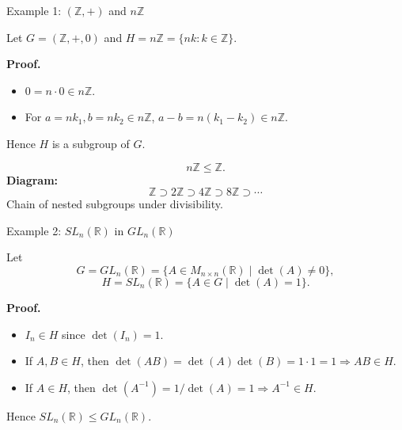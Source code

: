 \documentclass[11pt,aspectratio=43,ignorenonframetext,t]{beamer}
\begin{document}
\begin{frame}{Example 1: $(\mathbb{Z}, +)$ and $n\mathbb{Z}$}
\begin{block}{}
    Let \(G=(\mathbb{Z}, +, 0)\) and \(H = n\mathbb{Z} = \{nk : k\in \mathbb{Z}\}.\)

\textbf{Proof.}
\begin{itemize}
  \item \(0 = n\cdot 0 \in n\mathbb{Z}\).
  \item For \(a=nk_1, b=nk_2 \in n\mathbb{Z}\), \(a-b = n(k_1-k_2)\in n\mathbb{Z}\).
\end{itemize}
Hence \(H\) is a subgroup of \(G.\)

\[
n\mathbb{Z} \le \mathbb{Z}.
\]
\textbf{Diagram:}
\[
\mathbb{Z} \supset 2\mathbb{Z} \supset 4\mathbb{Z} \supset 8\mathbb{Z} \supset \cdots
\]
Chain of nested subgroups under divisibility.
\end{block}

\end{frame}

\begin{frame}{Example 2: $SL_n(\mathbb{R})$ in $GL_n(\mathbb{R})$}
\begin{block}{}
Let
\[
G = GL_n(\mathbb{R}) = \{A\in M_{n\times n}(\mathbb{R}) \mid \det(A)\ne 0\},
\]
\[
H = SL_n(\mathbb{R}) = \{A\in G \mid \det(A)=1\}.
\]

\textbf{Proof.}
\begin{itemize}
  \item \(I_n \in H\) since \(\det(I_n)=1.\)
  \item If \(A,B \in H\), then \(\det(AB)=\det(A)\det(B)=1\cdot1=1 \Rightarrow AB\in H.\)
  \item If \(A\in H\), then \(\det(A^{-1}) = 1/\det(A) = 1 \Rightarrow A^{-1}\in H.\)
\end{itemize}

Hence \(SL_n(\mathbb{R}) \le GL_n(\mathbb{R})\).
\end{block}
\end{frame}
\end{document}
